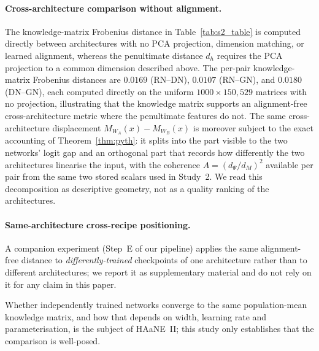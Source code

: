 \paragraph{Cross-architecture comparison without alignment.}
The knowledge-matrix Frobenius distance in Table~\ref{tab:s2_table} is
computed directly between architectures with no PCA projection,
dimension matching, or learned alignment, whereas the penultimate
distance $d_h$ requires the PCA projection to a common dimension
described above. The per-pair knowledge-matrix Frobenius distances are
$0.0169$ (RN--DN), $0.0107$ (RN--GN), and $0.0180$ (DN--GN), each computed
directly on the uniform $1000\times150{,}529$ matrices with no projection,
illustrating that the knowledge matrix supports an alignment-free
cross-architecture metric where the penultimate features do not. The same cross-architecture
displacement $M_{W_A}(x)-M_{W_B}(x)$ is moreover subject to the exact
accounting of Theorem~\ref{thm:pyth}: it splits into the part visible to
the two networks' logit gap and an orthogonal part that records how
differently the two architectures linearise the input, with the
coherence $A=(d_\Psi/d_M)^2$ available per pair from the same two stored
scalars used in Study~2. We read this decomposition as descriptive
geometry, not as a quality ranking of the architectures.

\paragraph{Same-architecture cross-recipe positioning.}
A companion experiment (Step~E of our pipeline) applies the same
alignment-free distance to \emph{differently-trained} checkpoints of one
architecture rather than to different architectures; we report it as
supplementary material and do not rely on it for any claim in this
paper.

Whether independently trained networks converge to the same
population-mean knowledge matrix, and how that depends on width, learning
rate and parameterisation, is the subject of HAaNE~II; this study only
establishes that the comparison is well-posed.
